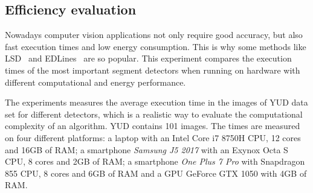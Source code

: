 \documentclass[preprint,12pt]{elsarticle}
\begin{document}
\subsection{Efficiency evaluation}
\label{sec:experiment-times}

Nowadays computer vision applications not only require good accuracy, but also fast execution times and low energy consumption. This is why some methods like LSD~\cite{grompone2010lsd} and EDLines~\cite{akinlar2011edlines} are so popular. This experiment compares the execution times of the most important segment detectors when running on hardware with different computational and energy performance.

The experiments measures the average execution time in the images of YUD data set for different detectors, which is a realistic way to evaluate the computational complexity of an algorithm.
YUD contains 101  images. The times are measured on four different platforms: a laptop with an Intel Core i7 8750H CPU, 12 cores and 16GB of RAM; a smartphone \textit{Samsung J5 2017} with an Exynox Octa S CPU, 8 cores and 2GB of RAM; a smartphone \textit{One Plus 7 Pro} with Snapdragon 855 CPU, 8 cores and 6GB of RAM and a GPU GeForce GTX 1050 with 4GB of RAM. 
\end{document}
